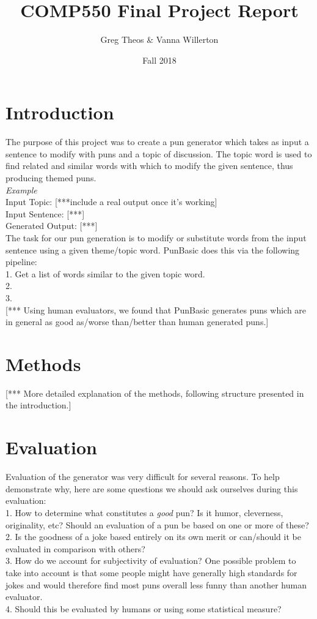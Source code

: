 \documentclass{article}
\title{COMP550 Final Project Report}
\author{Greg Theos & Vanna Willerton}
\date{Fall 2018}
\begin{document}
\maketitle

\section{Introduction}

The purpose of this project was to create a pun generator which takes as input a sentence to modify with puns and a topic of discussion. The topic word is used to find related and similar words with which to modify the given sentence, thus producing themed puns. \\

\textit{Example}\\
Input Topic: [***include a real output once it's working] \\
Input Sentence: [***] \\
Generated Output: [***] \\

The task for our pun generation is to modify or substitute words from the input sentence using a given theme/topic word. PunBasic does this via the following pipeline:\\
1. Get a list of words similar to the given topic word.\\
2. \\
3. \\

[*** Using human evaluators, we found that PunBasic generates puns which are in general as good as/worse than/better than human generated puns.]

\section{Methods}

[*** More detailed explanation of the methods, following structure presented in the introduction.]

\section{Evaluation}

Evaluation of the generator was very difficult for several reasons. To help demonstrate why, here are some questions we should ask ourselves during this evaluation: \\
1. How to determine what constitutes a \textit{good} pun? Is it humor, cleverness, originality, etc? Should an evaluation of a pun be based on one or more of these?\\
2. Is the goodness of a joke based entirely on its own merit or can/should it be evaluated in comparison with others?\\
3. How do we account for subjectivity of evaluation? One possible problem to take into account is that some people might have generally high standards for jokes and would therefore find most puns overall less funny than another human evaluator.\\
4. Should this be evaluated by humans or using some statistical measure?\\
\end{document}
